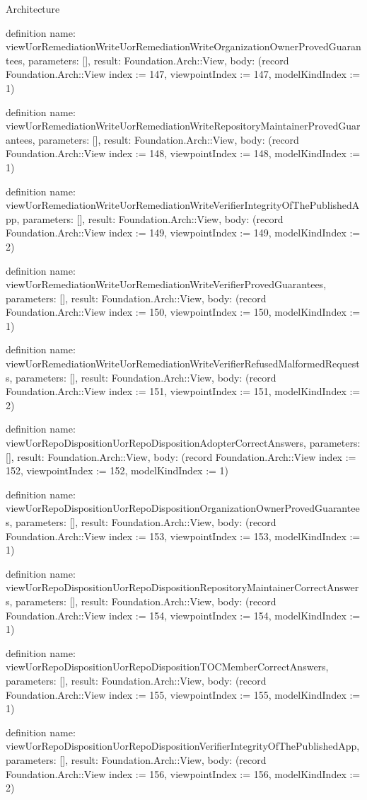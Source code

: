 \begin{lexlean}{Architecture}
\begin{semanticmodule}
definition{
  name: viewUorRemediationWriteUorRemediationWriteOrganizationOwnerProvedGuarantees,
  parameters: [],
  result: Foundation.Arch::View,
  body: (record Foundation.Arch::View {index := 147, viewpointIndex := 147, modelKindIndex := 1})
}

definition{
  name: viewUorRemediationWriteUorRemediationWriteRepositoryMaintainerProvedGuarantees,
  parameters: [],
  result: Foundation.Arch::View,
  body: (record Foundation.Arch::View {index := 148, viewpointIndex := 148, modelKindIndex := 1})
}

definition{
  name: viewUorRemediationWriteUorRemediationWriteVerifierIntegrityOfThePublishedApp,
  parameters: [],
  result: Foundation.Arch::View,
  body: (record Foundation.Arch::View {index := 149, viewpointIndex := 149, modelKindIndex := 2})
}

definition{
  name: viewUorRemediationWriteUorRemediationWriteVerifierProvedGuarantees,
  parameters: [],
  result: Foundation.Arch::View,
  body: (record Foundation.Arch::View {index := 150, viewpointIndex := 150, modelKindIndex := 1})
}

definition{
  name: viewUorRemediationWriteUorRemediationWriteVerifierRefusedMalformedRequests,
  parameters: [],
  result: Foundation.Arch::View,
  body: (record Foundation.Arch::View {index := 151, viewpointIndex := 151, modelKindIndex := 2})
}

definition{
  name: viewUorRepoDispositionUorRepoDispositionAdopterCorrectAnswers,
  parameters: [],
  result: Foundation.Arch::View,
  body: (record Foundation.Arch::View {index := 152, viewpointIndex := 152, modelKindIndex := 1})
}

definition{
  name: viewUorRepoDispositionUorRepoDispositionOrganizationOwnerProvedGuarantees,
  parameters: [],
  result: Foundation.Arch::View,
  body: (record Foundation.Arch::View {index := 153, viewpointIndex := 153, modelKindIndex := 1})
}

definition{
  name: viewUorRepoDispositionUorRepoDispositionRepositoryMaintainerCorrectAnswers,
  parameters: [],
  result: Foundation.Arch::View,
  body: (record Foundation.Arch::View {index := 154, viewpointIndex := 154, modelKindIndex := 1})
}

definition{
  name: viewUorRepoDispositionUorRepoDispositionTOCMemberCorrectAnswers,
  parameters: [],
  result: Foundation.Arch::View,
  body: (record Foundation.Arch::View {index := 155, viewpointIndex := 155, modelKindIndex := 1})
}

definition{
  name: viewUorRepoDispositionUorRepoDispositionVerifierIntegrityOfThePublishedApp,
  parameters: [],
  result: Foundation.Arch::View,
  body: (record Foundation.Arch::View {index := 156, viewpointIndex := 156, modelKindIndex := 2})
}


\end{semanticmodule}
\end{lexlean}
